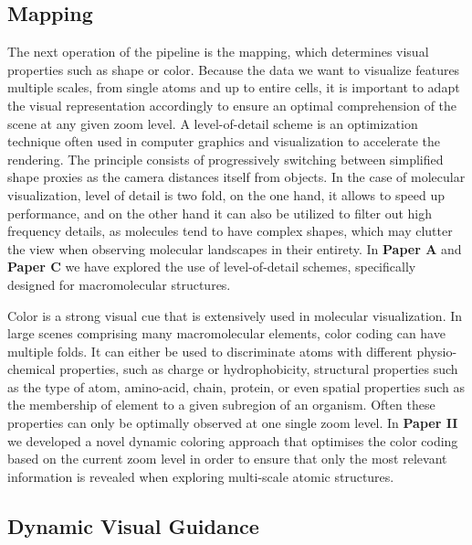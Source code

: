 \subsection{Mapping}

The next operation of the pipeline is the mapping, which determines visual properties such as shape or color.
Because the data we want to visualize features multiple scales, from single atoms and up to entire cells, it is important to adapt the visual representation accordingly to ensure an optimal comprehension of the scene at any given zoom level.
A level-of-detail scheme is an optimization technique often used in computer graphics and visualization to accelerate the rendering.
The principle consists of progressively switching between simplified shape proxies as the camera distances itself from objects.
In the case of molecular visualization, level of detail is two fold, on the one hand, it allows to speed up performance, and on the other hand it can also be utilized to filter out high frequency details, as molecules tend to have complex shapes, which may clutter the view when observing molecular landscapes in their entirety.
In \textbf{Paper A} and \textbf{Paper C} we have explored the use of level-of-detail schemes, specifically designed for macromolecular structures. 

Color is a strong visual cue that is extensively used in molecular visualization.
In large scenes comprising many macromolecular elements, color coding can have multiple folds.
It can either be used to discriminate atoms with different physio-chemical properties, such as charge or hydrophobicity, structural properties such as the type of atom, amino-acid, chain, protein, or even spatial properties such as the membership of element to a given subregion of an organism.
Often these properties can only be optimally observed at one single zoom level.
In \textbf{Paper II} we developed a novel dynamic coloring approach that optimises the color coding based on the current zoom level in order to ensure that only the most relevant information is revealed when exploring multi-scale atomic structures.

\subsection{Dynamic Visual Guidance}

